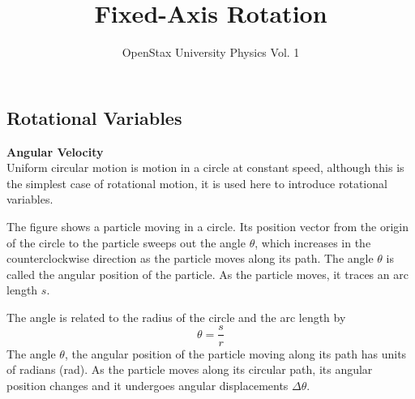 \documentclass[a4paper]{article}
\title{Fixed-Axis Rotation}
\author{OpenStax University Physics Vol. 1}
\date{}
\let\bf\textbf
\def\centerarc[#1](#2)(#3:#4:#5){\draw[#1] ($(#2)+({#5*cos(#3)},{#5*sin(#3)})$) arc (#3:#4:#5)}
\begin{document}
\setcounter{section}{10}
\maketitle
\subsection{Rotational Variables}
\noindent\bf{Angular Velocity}
\vspace{2mm}\\
Uniform circular motion is motion in a circle at constant speed, although this is the simplest case of rotational motion, it is used here to introduce rotational variables.\par
The figure shows a particle moving in a circle. Its position vector from the origin of the circle to the particle sweeps out the angle $\theta$, which increases in the counterclockwise direction as the particle moves along its path. The angle $\theta$ is called the angular position of the particle. As the particle moves, it traces an arc length $s$.
\begin{center}
\end{center}
The angle is related to the radius of the circle and the arc length by 
\begin{equation}
    \theta = \frac{s}{r}
\end{equation}
The angle $\theta$, the angular position of the particle moving along its path has units of radians (rad). As the particle moves along its circular path, its angular position changes and it undergoes angular displacements $\Delta\theta$.\par\vspace{1mm}
\end{document}
